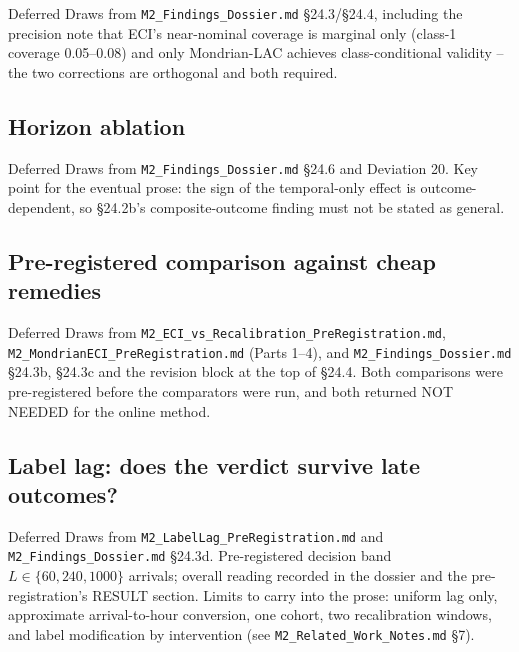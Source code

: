 \documentclass[11pt]{article}
\begin{document}




\begin{prosetodo}{Deferred}
Draws from \texttt{M2\_Findings\_Dossier.md} \S24.3/\S24.4, including the precision note that ECI's near-nominal coverage is marginal only (class-1 coverage 0.05--0.08) and only Mondrian-LAC achieves class-conditional validity -- the two corrections are orthogonal and both required.
\end{prosetodo}

\subsection{Horizon ablation}
\label{sec:horizon}


\begin{prosetodo}{Deferred}
Draws from \texttt{M2\_Findings\_Dossier.md} \S24.6 and Deviation 20. Key point for the eventual prose: the sign of the temporal-only effect is outcome-dependent, so \S24.2b's composite-outcome finding must not be stated as general.
\end{prosetodo}

\subsection{Pre-registered comparison against cheap remedies}
\label{sec:cheap-remedies}




\begin{prosetodo}{Deferred}
Draws from \texttt{M2\_ECI\_vs\_Recalibration\_PreRegistration.md}, \texttt{M2\_MondrianECI\_PreRegistration.md} (Parts 1--4), and \texttt{M2\_Findings\_Dossier.md} \S24.3b, \S24.3c and the revision block at the top of \S24.4. Both comparisons were pre-registered before the comparators were run, and both returned NOT NEEDED for the online method.
\end{prosetodo}

\subsection{Label lag: does the verdict survive late outcomes?}
\label{sec:label-lag}


\begin{prosetodo}{Deferred}
Draws from \texttt{M2\_LabelLag\_PreRegistration.md} and \texttt{M2\_Findings\_Dossier.md} \S24.3d. Pre-registered decision band $L\in\{60,240,1000\}$ arrivals; overall reading recorded in the dossier and the pre-registration's RESULT section. Limits to carry into the prose: uniform lag only, approximate arrival-to-hour conversion, one cohort, two recalibration windows, and label modification by intervention (see \texttt{M2\_Related\_Work\_Notes.md} \S7).
\end{prosetodo}
\end{document}
